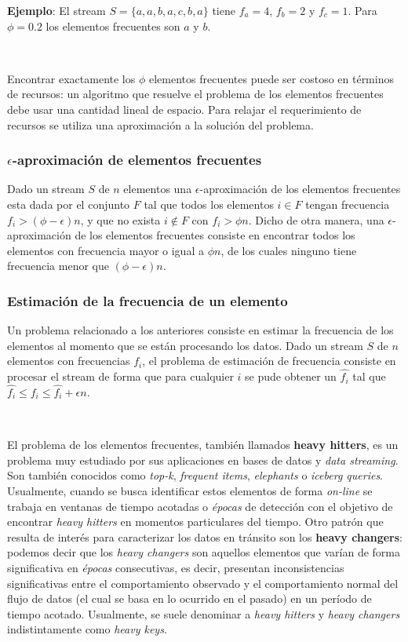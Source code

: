 \documentclass[a4paper,12pt, oneside]{article}
\begin{document}
\textbf{Ejemplo}: El stream $S=\{a,a,b,a,c,b,a\}$ tiene $f_a=4$, $f_b=2$ y $f_c=1$. Para $\phi=0.2$ los elementos frecuentes son $a$ y $b$.

\

Encontrar exactamente los $\phi$ elementos frecuentes puede ser costoso en términos de recursos: un algoritmo que resuelve el problema de los elementos frecuentes debe usar una cantidad lineal de espacio\cite{Cormode:2010:MFF:1731351.1731356}. Para relajar el requerimiento de recursos se utiliza una aproximación a la solución del problema.

\subsubsection{$\epsilon$-aproximación de elementos frecuentes} 
Dado un stream $S$ de $n$ elementos una $\epsilon$-aproximación de los elementos frecuentes esta dada por el conjunto $F$ tal que todos los elementos $i \in F$ tengan frecuencia $f_i > (\phi - \epsilon)n$, y que no exista $i \notin F$ con $f_i > \phi n$. Dicho de otra manera, una $\epsilon$-aproximación de los elementos frecuentes consiste en encontrar todos los elementos con frecuencia mayor o igual a $\phi n$, de los cuales ninguno tiene frecuencia menor que $(\phi - \epsilon) n$.

\subsubsection{Estimación de la frecuencia de un elemento}
Un problema relacionado a los anteriores consiste en estimar la frecuencia de los elementos al momento que se están procesando los datos. Dado un stream $S$ de $n$ elementos con frecuencias $f_i$, el problema de estimación de frecuencia consiste en procesar el stream de forma que para cualquier $i$ se pude obtener un $\hat{f_i}$ tal que $\hat{f_i} \leq f_i \leq \hat{f_i}+\epsilon n$.

\

El problema de los elementos frecuentes, también llamados \textbf{heavy hitters}, es un problema muy estudiado por sus aplicaciones en bases de datos y \textit{data streaming}. Son también conocidos como \textit{top-k}, \textit{frequent items}, \textit{elephants} o \textit{iceberg queries}. Usualmente, cuando se busca identificar estos elementos de forma \textit{on-line} se trabaja en ventanas de tiempo acotadas o \textit{épocas} de detección con el objetivo de encontrar \textit{heavy hitters} en momentos particulares del tiempo. Otro patrón que resulta de interés para caracterizar los datos en tránsito son los \textbf{heavy changers}: podemos decir que los \textit{heavy changers} son aquellos elementos que varían de forma significativa en \textit{épocas} consecutivas, es decir, presentan inconsistencias significativas entre el comportamiento observado y el comportamiento normal del flujo de datos (el cual se basa en lo ocurrido en el pasado) en un período de tiempo acotado\cite{Tong:2016:HTS:2927964.2927977}. Usualmente, se suele denominar a \textit{heavy hitters} y \textit{heavy changers} indistintamente como \textit{heavy keys}.
\end{document}
